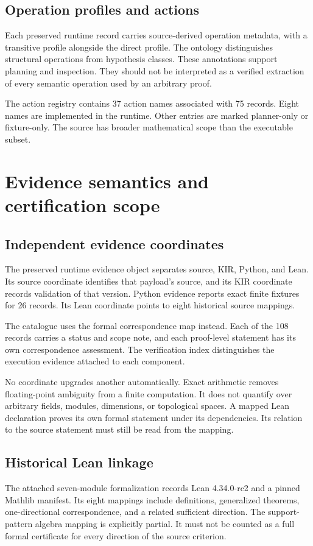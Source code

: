 \documentclass[a4paper,11pt]{article}
\begin{document}
\subsection{Operation profiles and actions}
Each preserved runtime record carries source-derived operation metadata, with a transitive profile alongside the direct profile. The ontology distinguishes structural operations from hypothesis classes. These annotations support planning and inspection. They should not be interpreted as a verified extraction of every semantic operation used by an arbitrary proof.

The action registry contains 37 action names associated with 75 records. Eight names are implemented in the runtime. Other entries are marked planner-only or fixture-only. The source has broader mathematical scope than the executable subset.

\section{Evidence semantics and certification scope}
\subsection{Independent evidence coordinates}
The preserved runtime evidence object separates source, KIR, Python, and Lean. Its source coordinate identifies that payload's source, and its KIR coordinate records validation of that version. Python evidence reports exact finite fixtures for 26 records. Its Lean coordinate points to eight historical source mappings.

The catalogue uses the formal correspondence map instead. Each of the 108 records carries a status and scope note, and each proof-level statement has its own correspondence assessment. The verification index distinguishes the execution evidence attached to each component.

No coordinate upgrades another automatically. Exact arithmetic removes floating-point ambiguity from a finite computation. It does not quantify over arbitrary fields, modules, dimensions, or topological spaces. A mapped Lean declaration proves its own formal statement under its dependencies. Its relation to the source statement must still be read from the mapping.


\subsection{Historical Lean linkage}
The attached seven-module formalization records Lean 4.34.0-rc2 and a pinned Mathlib manifest. Its eight mappings include definitions, generalized theorems, one-directional correspondence, and a related sufficient direction. The support-pattern algebra mapping is explicitly partial. It must not be counted as a full formal certificate for every direction of the source criterion.
\end{document}
